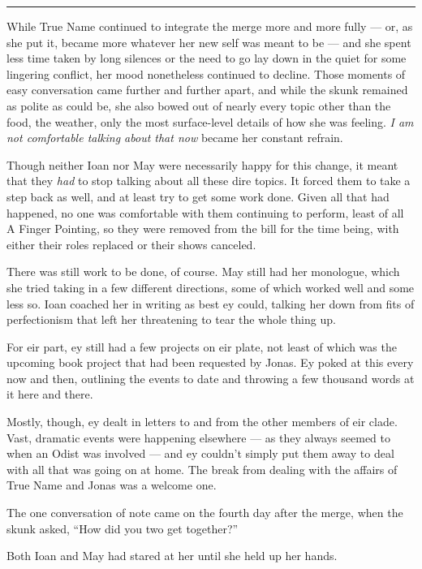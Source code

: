 \begin{center}\rule{0.5\linewidth}{0.5pt}\end{center}

While True Name continued to integrate the merge more and more fully — or, as she put it, became more whatever her new self was meant to be — and she spent less time taken by long silences or the need to go lay down in the quiet for some lingering conflict, her mood nonetheless continued to decline. Those moments of easy conversation came further and further apart, and while the skunk remained as polite as could be, she also bowed out of nearly every topic other than the food, the weather, only the most surface-level details of how she was feeling. \emph{I am not comfortable talking about that now} became her constant refrain.

Though neither Ioan nor May were necessarily happy for this change, it meant that they \emph{had} to stop talking about all these dire topics. It forced them to take a step back as well, and at least try to get some work done. Given all that had happened, no one was comfortable with them continuing to perform, least of all A Finger Pointing, so they were removed from the bill for the time being, with either their roles replaced or their shows canceled.

There was still work to be done, of course. May still had her monologue, which she tried taking in a few different directions, some of which worked well and some less so. Ioan coached her in writing as best ey could, talking her down from fits of perfectionism that left her threatening to tear the whole thing up.

For eir part, ey still had a few projects on eir plate, not least of which was the upcoming book project that had been requested by Jonas. Ey poked at this every now and then, outlining the events to date and throwing a few thousand words at it here and there.

Mostly, though, ey dealt in letters to and from the other members of eir clade. Vast, dramatic events were happening elsewhere — as they always seemed to when an Odist was involved — and ey couldn't simply put them away to deal with all that was going on at home. The break from dealing with the affairs of True Name and Jonas was a welcome one.

The one conversation of note came on the fourth day after the merge, when the skunk asked, ``How did you two get together?''

Both Ioan and May had stared at her until she held up her hands.

